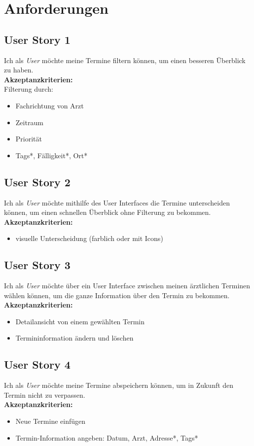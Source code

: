 \documentclass[conference]{IEEEtran}
\begin{document}
\section{Anforderungen}
\subsection{User Story 1}
Ich als \textit{User} möchte meine Termine filtern können, um einen besseren Überblick zu haben.\\
\textbf{Akzeptanzkriterien:}\\
Filterung durch:
\begin{itemize}
	\item Fachrichtung von Arzt
	\item Zeitraum
	\item Priorität
	\item Tags*, Fälligkeit*, Ort* 
\end{itemize}

\subsection{User Story 2}
Ich als \textit{User} möchte mithilfe des User Interfaces die Termine unterscheiden können, um einen schnellen Überblick ohne Filterung zu bekommen.\\
\textbf{Akzeptanzkriterien:}
\begin{itemize}
	\item visuelle Unterscheidung (farblich oder mit Icons)
\end{itemize}

\subsection{User Story 3}
Ich als \textit{User} möchte über ein User Interface zwischen meinen ärztlichen Terminen wählen können, um die ganze Information über den Termin zu bekommen.\\
\textbf{Akzeptanzkriterien:}
\begin{itemize}
	\item Detailansicht von einem gewählten Termin
	\item Termininformation ändern und löschen
\end{itemize}

\subsection{User Story 4}
Ich als \textit{User} möchte meine Termine abspeichern können, um in Zukunft den Termin nicht zu verpassen.\\
\textbf{Akzeptanzkriterien:}
\begin{itemize}
	\item Neue Termine einfügen
	\item Termin-Information angeben: Datum, Arzt, Adresse*, Tags*
\end{itemize}
\end{document}
